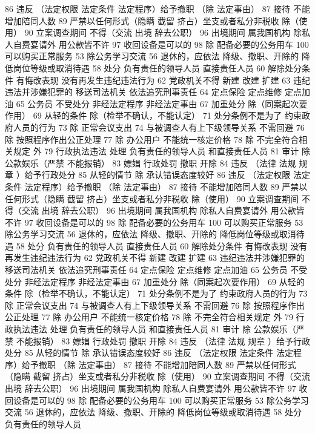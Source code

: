 \documentclass[cyan]{elegantnote}
\begin{document}
86 违反 （法定权限 法定条件 法定程序）给予撤职
（除 法定事由）
87 接待 不能增加陪同人数
89 严禁以任何形式（隐瞒 截留 挤占）坐支或者私分非税收
除（使用）
90 立案调查期间 不得（交流 出境 辞去公职）
96 出境期间 属我国机构 除私人自费宴请外 用公款皆不许
97 收回设备是可以的
98 除 配备必要的公务用车
100 可以购买正常服务
53 除公务学习交流
56 退休的，应依法
降级、撤职、开除的 降低岗位等级或取消待遇
58 处分
负有责任的领导人员
直接责任人员
60 解除处分条件
有悔改表现
没有再发生违纪违法行为
62 党政机关不得
新建 改建 扩建
63 违纪违法并涉嫌犯罪的
移送司法机关
依法追究刑事责任
64 定点保险 定点维修 定点加油
65 公务员 不受处分
非经法定程序
非经法定事由
67 加重处分
除（同案起次要作用）
69 从轻的条件
除（检举不确认，不能认定）
71 处分条例不是为了
约束政府人员的行为
73 除 正常会议支出
74 与被调查人有上下级领导关系 不需回避
76 除 按照程序作出公正处理
77 除 办公用户
不能统一核定价格
78 除 不完全符合相关规定 外
79 行政执法违法 处理
负有责任的领导人员
和直接责任人员
81 审计
除 公款娱乐（严禁 不能报销）
83 嫖娼 行政处罚
撤职 开除
84 违反 （法律 法规 规章 ）给予行政处分
85 从轻的情节
除 承认错误态度较好
86 违反 （法定权限 法定条件 法定程序）给予撤职
（除 法定事由）
87 接待 不能增加陪同人数
89 严禁以任何形式（隐瞒 截留 挤占）坐支或者私分非税收
除（使用）
90 立案调查期间 不得（交流 出境 辞去公职）
96 出境期间 属我国机构 除私人自费宴请外 用公款皆不许
97 收回设备是可以的
98 除 配备必要的公务用车
100 可以购买正常服务
53 除公务学习交流
56 退休的，应依法
降级、撤职、开除的 降低岗位等级或取消待遇
58 处分
负有责任的领导人员
直接责任人员
60 解除处分条件
有悔改表现
没有再发生违纪违法行为
62 党政机关不得
新建 改建 扩建
63 违纪违法并涉嫌犯罪的
移送司法机关
依法追究刑事责任
64 定点保险 定点维修 定点加油
65 公务员 不受处分
非经法定程序
非经法定事由
67 加重处分
除（同案起次要作用）
69 从轻的条件
除（检举不确认，不能认定）
71 处分条例不是为了
约束政府人员的行为
73 除 正常会议支出
74 与被调查人有上下级领导关系 不需回避
76 除 按照程序作出公正处理
77 除 办公用户
不能统一核定价格
78 除 不完全符合相关规定 外
79 行政执法违法 处理
负有责任的领导人员
和直接责任人员
81 审计
除 公款娱乐（严禁 不能报销）
83 嫖娼 行政处罚
撤职 开除
84 违反 （法律 法规 规章 ）给予行政处分
85 从轻的情节
除 承认错误态度较好
86 违反 （法定权限 法定条件 法定程序）给予撤职
（除 法定事由）
87 接待 不能增加陪同人数
89 严禁以任何形式（隐瞒 截留 挤占）坐支或者私分非税收
除（使用）
90 立案调查期间 不得（交流 出境 辞去公职）
96 出境期间 属我国机构 除私人自费宴请外 用公款皆不许
97 收回设备是可以的
98 除 配备必要的公务用车
100 可以购买正常服务
53 除公务学习交流
56 退休的，应依法
降级、撤职、开除的 降低岗位等级或取消待遇
58 处分
负有责任的领导人员
\end{document}
